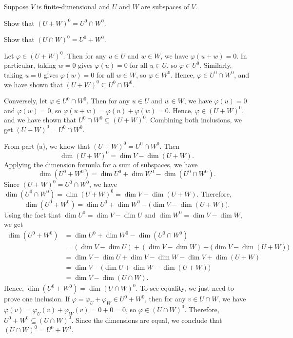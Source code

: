 \begin{exc}
\begin{exercise}
Suppose $V$ is finite-dimensional and $U$ and $W$ are subspaces of $V$.
\begin{parts}
\item Show that $(U+W)^0=U^0\cap W^0$.
\item Show that $(U\cap W)^0=U^0+W^0$.
\end{parts}
\end{exercise}
\begin{solution}\leavevmode
\begin{parts}
\item Let $\varphi\in(U+W)^0$. Then for any $u\in U$ and $w\in W$, we have
  $\varphi(u+w)=0$. In particular, taking $w=0$ gives $\varphi(u)=0$ for all
  $u\in U$, so $\varphi\in U^0$. Similarly, taking $u=0$ gives $\varphi(w)=0$
  for all $w\in W$, so $\varphi\in W^0$. Hence, $\varphi\in U^0\cap W^0$, and we
  have shown that $(U+W)^0\subseteq U^0\cap W^0$.

  Conversely, let $\varphi\in U^0\cap W^0$. Then for any $u\in U$ and $w\in W$,
  we have $\varphi(u)=0$ and $\varphi(w)=0$, so
  $\varphi(u+w)=\varphi(u)+\varphi(w)=0$. Hence, $\varphi\in(U+W)^0$, and we
  have shown that $U^0\cap W^0\subseteq(U+W)^0$. Combining both inclusions, we
  get $(U+W)^0=U^0\cap W^0$.
\item From part (a), we know that $(U+W)^0=U^0\cap W^0$. Then
  \[ \dim(U+W)^0 = \dim V-\dim(U+W). \]
  Applying the dimension formula for a sum of subspaces, we have
  \[ \dim(U^0+W^0) = \dim U^0+\dim W^0-\dim(U^0\cap W^0). \]
  Since $(U+W)^0=U^0\cap W^0$, we have
  $\dim(U^0\cap W^0)=\dim(U+W)^0=\dim V-\dim(U+W)$. Therefore,
  \[ \dim(U^0+W^0) = \dim U^0+\dim W^0-\bigl(\dim V-\dim(U+W)\bigr). \]
  Using the fact that $\dim U^0=\dim V-\dim U$ and $\dim W^0=\dim V-\dim W$, we
  get
  \begin{align*}
  \dim(U^0+W^0)
   &= \dim U^0+\dim W^0-\dim(U^0\cap W^0)\\
   &= (\dim V-\dim U)+(\dim V-\dim W)-\bigl(\dim V-\dim(U+W)\bigr)\\
   &= \dim V-\dim U+\dim V-\dim W-\dim V+\dim(U+W)\\
   &= \dim V-\bigl(\dim U+\dim W-\dim(U+W)\bigr)\\
   &= \dim V-\dim(U\cap W).
  \end{align*}
  Hence, $\dim(U^0+W^0)=\dim(U\cap W)^0$. To see equality, we just need to
  prove one inclusion. If $\varphi=\varphi_U+\varphi_W\in U^0+W^0$, then for any
  $v\in U\cap W$, we have $\varphi(v)=\varphi_U(v)+\varphi_W(v)=0+0=0$, so
  $\varphi\in(U\cap W)^0$. Therefore, $U^0+W^0\subseteq(U\cap W)^0$. Since the
  dimensions are equal, we conclude that $(U\cap W)^0=U^0+W^0$.
\end{parts}
\end{solution}


\end{exc}
